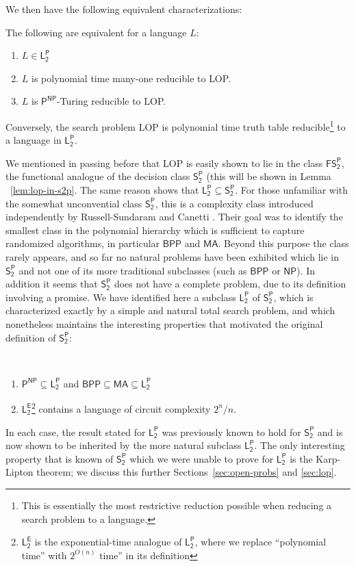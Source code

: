 We then have the following equivalent characterizations:
\begin{theorem}\label{thm:l2p-complete-intro}
The following are equivalent for a language $L$:
\begin{enumerate}
    \item $L \in \mathsf{L_2^P}$
    \item $L$ is polynomial time many-one reducible to {\sc LOP}.
    \item $L$ is $\mathsf{P^{NP}}
$-Turing reducible to {\sc LOP}.
\end{enumerate}
Conversely, the search problem {\sc LOP} is polynomial time truth table reducible\footnote{This is essentially the most restrictive reduction possible when reducing a search problem to a language.} to a language in $\mathsf{L_2^P}$.
\end{theorem}
We mentioned in passing before that {\sc LOP} is easily shown to lie in the class $\mathsf{FS_2^P}$, the functional analogue of the decision class $\mathsf{S_2^P}$ (this will be shown in Lemma ~\ref{lem:lop-in-s2p}. The same reason shows that $\mathsf{L_2^P} \subseteq \mathsf{S_2^P}$. For those unfamiliar with the somewhat unconvential class $\mathsf{S_2^P}$, this is a complexity class introduced independently by Russell-Sundaram and Canetti \cite{russell-sundaram,canetti}. Their goal was to identify the smallest class in the polynomial hierarchy which is sufficient to capture randomized algorithms, in particular $\mathsf{BPP}$ and $\mathsf{MA}$. Beyond this purpose the class rarely appears, and so far no natural problems have been exhibited which lie in $\mathsf{S_2^P}$ and not one of its more traditional subclasses (such as $\mathsf{BPP}$ or $\mathsf{NP}$). In addition it seems that $\mathsf{S_2^P}$ does not have a complete problem, due to its definition involving a promise. We have identified here a subclass $\mathsf{L_2^P}$ of $\mathsf{S_2^P}$, which is characterized exactly by a simple and natural total search problem, and which nonetheless maintains the interesting properties that motivated the original definition of $\mathsf{S_2^P}$:
\begin{theorem}\label{thm:l2p-structural-intro}
\phantom\\
\begin{enumerate}
    \item $\mathsf{P^{NP}} \subseteq \mathsf{L_2^P}$ and $\mathsf{BPP} \subseteq \mathsf{MA} \subseteq \mathsf{L_2^P}$
    \item $\mathsf{L_2^E}$\footnote{$\mathsf{L_2^E}$ is the exponential-time analogue of $\mathsf{L_2^P}$, where we replace ``polynomial time'' with $2^{O(n)}$ time'' in its definition} contains a language of circuit complexity $2^n/n$.
\end{enumerate}
\end{theorem}
In each case, the result stated for $\mathsf{L_2^P}$ was previously known to hold for $\mathsf{S_2^P}$ and is now shown to be inherited by the more natural subclass $\mathsf{L_2^P}$. The only interesting property that is known of $\mathsf{S_2^P}$ which we were unable to prove for $\mathsf{L_2^P}$ is the Karp-Lipton theorem; we discuss this further Sections~\ref{sec:open-probs} and \ref{sec:lop}.


